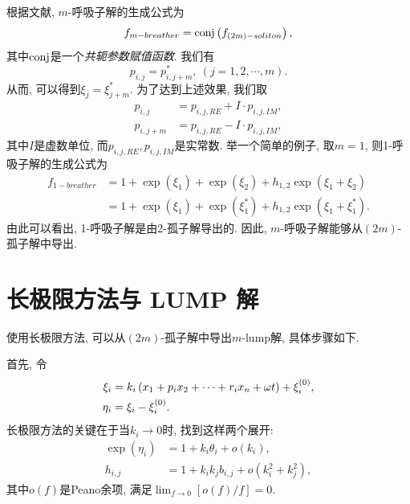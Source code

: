 根据文献\cite{tajiri1989breather}, $m$-呼吸子解的生成公式为
\begin{equation}
    f_{m-breather}={\rm conj}\left(f_{(2m)-soliton}\right), \label{f-breather}
\end{equation}
其中${\rm conj}$是一个\emph{共轭参数赋值函数}. 我们有 
\begin{equation}
    p_{i,j}=p_{i,j+m}^*,~(j=1,2,\cdots,m).
\end{equation}
从而, 可以得到$\xi_{j}=\xi_{j+m}^*$. 为了达到上述效果, 我们取
\begin{equation}
\begin{split}
    p_{i,j}&=p_{i,j,RE}+I\cdot p_{i,j,IM}, \\ 
    p_{i,j+m}&=p_{i,j,RE}-I\cdot p_{i,j,IM},
\end{split}
\end{equation}
其中$I$是虚数单位, 而$p_{i,j,RE},p_{i,j,IM}$是实常数. 举一个简单的例子, 取$m=1$, 则1-呼吸子解的生成公式为
\begin{equation}
\begin{split}
f_{1-breather}&=1+\exp(\xi_1)+\exp(\xi_2)+h_{1,2}\exp(\xi_1+\xi_2) \\ 
&=1+\exp(\xi_1)+\exp(\xi_1^*)+h_{1,2}\exp(\xi_1+\xi_1^*).
\end{split}
\end{equation}
由此可以看出, 1-呼吸子解是由2-孤子解导出的. 因此, $m$-呼吸子解能够从$(2m)$-孤子解中导出.

\section{长极限方法与 LUMP 解}
使用长极限方法\cite{satsuma1979two}, 可以从$(2m)$-孤子解中导出$m$-lump解, 具体步骤如下.

首先, 令
\begin{equation}
\begin{split}
    \xi_i&=k_i\left(x_1+p_ix_2+\cdots+r_ix_n+\omega t\right)+\xi_i^{(0)},\\
    \eta_i&=\xi_i-\xi_i^{(0)}.
\end{split}
\end{equation}
长极限方法的关键在于当$k_i\rightarrow 0$时, 找到这样两个展开:
\begin{equation}
\begin{split}
    \exp(\eta_i)&=1+k_i \theta_i+o(k_i), \\ 
    h_{i,j}&=1+k_ik_jb_{i,j}+o(k_i^2+k_j^2),
\end{split} \label{lump-expansion}
\end{equation}
其中$o(f)$是Peano余项, 满足$\lim_{f\rightarrow 0}[o(f)/f]=0$.

